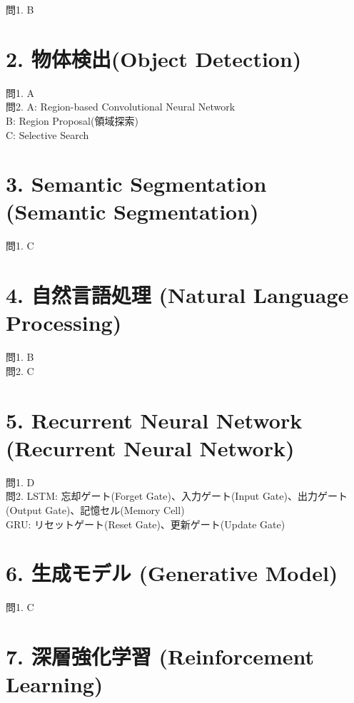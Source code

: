 \documentclass[
  letterpaper,
  DIV=11,
  numbers=noendperiod]{scrreprt}
\begin{document}
問1. B

\section{2. 物体検出(Object
Detection)}\label{ux7269ux4f53ux691cux51faobject-detection-1}

問1. A\\
問2. A: Region-based Convolutional Neural Network\\
B: Region Proposal(領域探索)\\
C: Selective Search

\section{3. Semantic Segmentation (Semantic
Segmentation)}\label{semantic-segmentation-semantic-segmentation-1}

問1. C

\section{4. 自然言語処理 (Natural Language
Processing)}\label{ux81eaux7136ux8a00ux8a9eux51e6ux7406-natural-language-processing-1}

問1. B\\
問2. C

\section{5. Recurrent Neural Network (Recurrent Neural
Network)}\label{recurrent-neural-network-recurrent-neural-network-1}

問1. D\\
問2. LSTM: 忘却ゲート(Forget Gate)、入力ゲート(Input
Gate)、出力ゲート(Output Gate)、記憶セル(Memory Cell)\\
GRU: リセットゲート(Reset Gate)、更新ゲート(Update Gate)

\section{6. 生成モデル (Generative
Model)}\label{ux751fux6210ux30e2ux30c7ux30eb-generative-model-1}

問1. C

\section{7. 深層強化学習 (Reinforcement
Learning)}\label{ux6df1ux5c64ux5f37ux5316ux5b66ux7fd2-reinforcement-learning-1}
\end{document}
